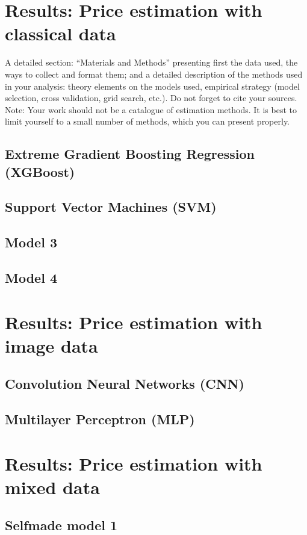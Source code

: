 \documentclass[12pt]{article}
\begin{document}
\section{Results: Price estimation with classical data}
A detailed section: “Materials and Methods” presenting first the data used, the ways to collect and
format them; and a detailed description of the methods used in your analysis: theory elements on
the models used, empirical strategy (model selection, cross validation, grid search, etc.). Do not
forget to cite your sources.
Note: Your work should not be a catalogue of estimation methods. It is best to limit yourself to a
small number of methods, which you can present properly.

\subsection{Extreme Gradient Boosting Regression (XGBoost)}
\subsection{Support Vector Machines (SVM)}
\subsection{Model 3}
\subsection{Model 4}

\section{Results: Price estimation with image data}
\subsection{Convolution Neural Networks (CNN)}
\subsection{Multilayer Perceptron (MLP)}

\section{Results: Price estimation with mixed data}
\subsection{Selfmade model 1}
\end{document}
